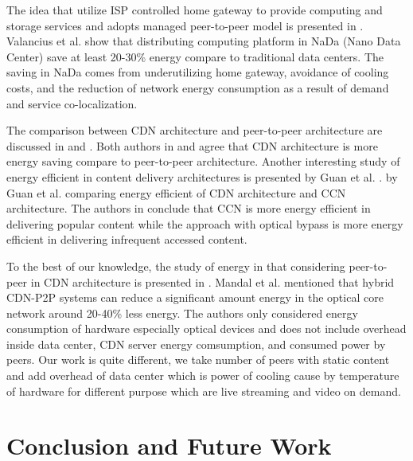 \documentclass[JIP]{ipsj}
\begin{document}
The idea that utilize ISP controlled home gateway to provide computing and storage services and adopts managed peer-to-peer model is presented in \cite{valancius2009greening}. 
Valancius et al. \cite{valancius2009greening} show that distributing computing platform in NaDa (Nano Data Center) save at least 20-30\% energy compare to traditional data centers.
The saving in NaDa comes from underutilizing home gateway, avoidance of cooling costs, and the reduction of network energy consumption as a result of demand and service co-localization.

The comparison between CDN architecture and peer-to-peer architecture are discussed in \cite{baliga2007energy} and \cite{feldmann2010energy}.
Both authors in \cite{baliga2007energy} and \cite{feldmann2010energy} agree that CDN architecture is more energy saving compare to peer-to-peer architecture. 
Another interesting study of energy efficient in content delivery architectures is presented by Guan et al. \cite{5963557}.
by Guan et al. \cite{5963557} comparing energy efficient of CDN architecture and CCN architecture.
The authors in \cite{5963557} conclude that CCN is more energy efficient in delivering popular content while the approach with optical bypass is more energy efficient in delivering infrequent accessed content.

To the best of our knowledge, the study of energy in that considering peer-to-peer in CDN architecture is presented in \cite{6524219}.
Mandal et al. \cite{6524219} mentioned that hybrid CDN-P2P systems can reduce a significant amount energy in the optical core network around 20-40\% less energy.  
The authors only considered energy consumption of hardware especially optical devices and does not include overhead inside data center, CDN server energy comsumption, and consumed power by peers.
Our work is quite different, we take number of peers with static content and add overhead of data center which is  power of cooling cause by temperature of hardware for different purpose which are live streaming and video on demand.

 


\section{Conclusion and Future Work}\label{conclusion}
\end{document}
